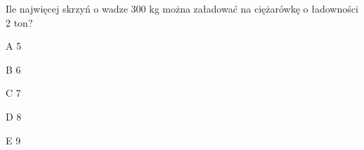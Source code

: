 \begin{tresc}
Ile najwięcej skrzyń o wadze 300 kg można załadować na ciężarówkę o ładowności 2 ton?
\end{tresc}
\begin{wariant}{A} 5 \end{wariant}
\begin{wariant}{B} 6 \end{wariant}
\begin{wariant}{C} 7 \end{wariant}
\begin{wariant}{D} 8 \end{wariant}
\begin{wariant}{E} 9 \end{wariant}
